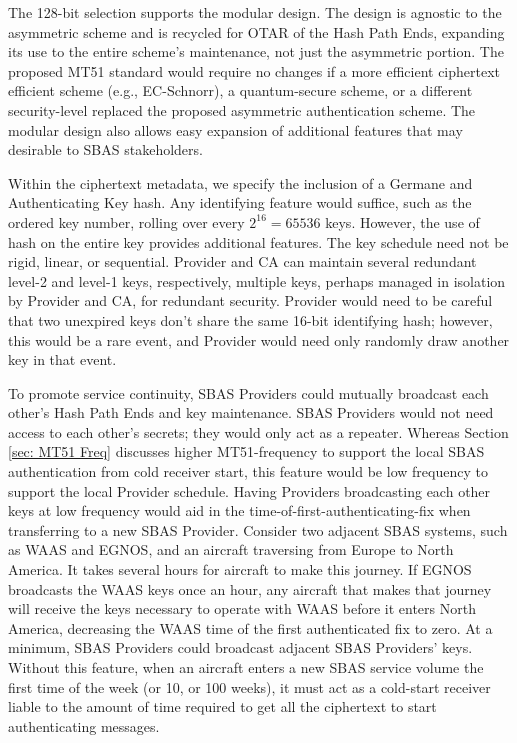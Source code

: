 \documentclass[letterpaper,times]{IONconf/IONconf}
\begin{document}
The 128-bit selection supports the modular design.
The design is agnostic to the asymmetric scheme and is recycled for OTAR of the Hash Path Ends, expanding its use to the entire scheme's maintenance, not just the asymmetric portion.
The proposed MT51 standard would require no changes if a more efficient ciphertext efficient scheme (e.g., EC-Schnorr), a quantum-secure scheme, or a different security-level replaced the proposed asymmetric authentication scheme.
The modular design also allows easy expansion of additional features that may desirable to SBAS stakeholders.

Within the ciphertext metadata, we specify the inclusion of a Germane and Authenticating Key hash.
Any identifying feature would suffice, such as the ordered key number, rolling over every $2^{16} = 65536$ keys.
However, the use of hash on the entire key provides additional features.
The key schedule need not be rigid, linear, or sequential.
Provider and CA can maintain several redundant level-2 and level-1 keys, respectively, multiple keys, perhaps managed in isolation by Provider and CA, for redundant security.
Provider would need to be careful that two unexpired keys don't share the same 16-bit identifying hash; however, this would be a rare event, and Provider would need only randomly draw another key in that event.

To promote service continuity, SBAS Providers could mutually broadcast each other's Hash Path Ends and key maintenance.
SBAS Providers would not need access to each other's secrets; they would only act as a repeater.
Whereas Section \ref{sec: MT51 Freq} discusses higher MT51-frequency to support the local SBAS authentication from cold receiver start, this feature would be low frequency to support the local Provider schedule.
Having Providers broadcasting each other keys at low frequency would aid in the time-of-first-authenticating-fix when transferring to a new SBAS Provider.
Consider two adjacent SBAS systems, such as WAAS and EGNOS, and an aircraft traversing from Europe to North America.
It takes several hours for aircraft to make this journey.
If EGNOS broadcasts the WAAS keys once an hour, any aircraft that makes that journey will receive the keys necessary to operate with WAAS before it enters North America, decreasing the WAAS time of the first authenticated fix to zero. 
At a minimum, SBAS Providers could broadcast adjacent SBAS Providers' keys.
Without this feature, when an aircraft enters a new SBAS service volume the first time of the week (or 10, or 100 weeks), it must act as a cold-start receiver liable to the amount of time required to get all the ciphertext to start authenticating messages.
\end{document}
